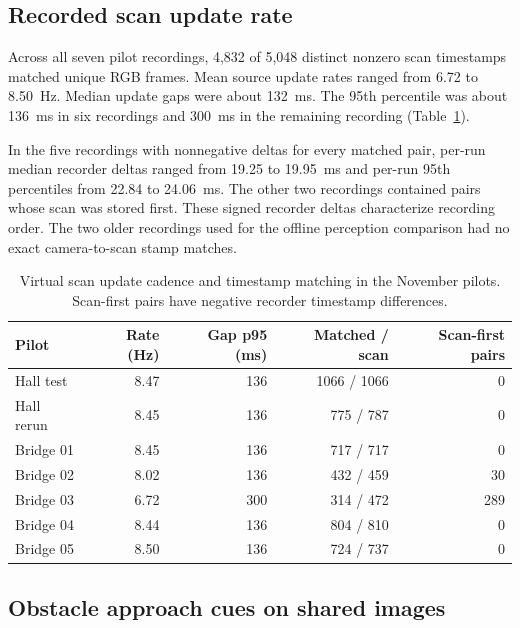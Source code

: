 \documentclass[pdflatex,sn-mathphys-num]{sn-jnl}
\begin{document}
\subsection{Recorded scan update rate}

Across all seven pilot recordings, 4,832 of 5,048 distinct nonzero scan timestamps matched unique RGB frames. Mean source update rates ranged from 6.72 to 8.50~Hz. Median update gaps were about 132~ms. The 95th percentile was about 136~ms in six recordings and 300~ms in the remaining recording (Table~\ref{tab:recorder-timing}).

In the five recordings with nonnegative deltas for every matched pair, per-run median recorder deltas ranged from 19.25 to 19.95~ms and per-run 95th percentiles from 22.84 to 24.06~ms. The other two recordings contained pairs whose scan was stored first. These signed recorder deltas characterize recording order. The two older recordings used for the offline perception comparison had no exact camera-to-scan stamp matches.

\begin{table}[htbp]
\caption{Virtual scan update cadence and timestamp matching in the November pilots. Scan-first pairs have negative recorder timestamp differences.}
\label{tab:recorder-timing}
\centering
\begin{tabular}{@{}lrrrr@{}}
\toprule
Pilot & Rate (Hz) & Gap p95 (ms) & Matched / scan & Scan-first pairs \\
\midrule
Hall test & 8.47 & 136 & 1066 / 1066 & 0 \\
Hall rerun & 8.45 & 136 & 775 / 787 & 0 \\
Bridge 01 & 8.45 & 136 & 717 / 717 & 0 \\
Bridge 02 & 8.02 & 136 & 432 / 459 & 30 \\
Bridge 03 & 6.72 & 300 & 314 / 472 & 289 \\
Bridge 04 & 8.44 & 136 & 804 / 810 & 0 \\
Bridge 05 & 8.50 & 136 & 724 / 737 & 0 \\
\bottomrule
\end{tabular}
\end{table}

\subsection{Obstacle approach cues on shared images}\label{sec:box-cues}
\end{document}
